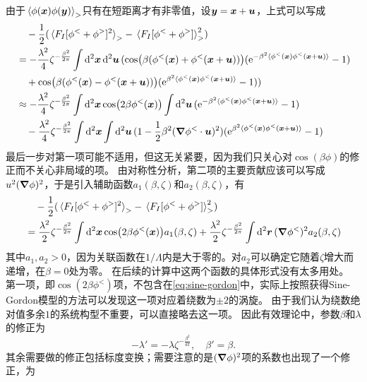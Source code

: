 \documentclass[hyperref, UTF8, a4paper]{ctexart}
\newcommand*{\ee}{\mathrm{e}}
\begin{document}
由于$\expval*{\phi(\vb*{x}) \phi(\vb*{y})}_>$只有在短距离才有非零值，设$\vb*{y} = \vb*{x} + \vb*{u}$，上式可以写成
\[
    \begin{aligned}
        &\quad - \frac{1}{2} (\expval*{F_I[\phi^<+\phi^>]^2}_> - \expval*{F_I[\phi^<+\phi^>]}_>^2) \\
        &= - \frac{\lambda^2}{4} \zeta^{- \frac{\beta^2}{2 \pi}} \int \dd[2]{\vb*{x}} \dd[2]{\vb*{u}} (\cos(\beta(\phi^<(\vb*{x}) + \phi^<(\vb*{x}+\vb*{u}))) (\ee^{- \beta^2 \expval*{\phi^<(\vb*{x}) \phi^<(\vb*{x}+\vb*{u})}} - 1) \\
        &\quad + \cos(\beta(\phi^<(\vb*{x}) - \phi^<(\vb*{x}+\vb*{u}))) (\ee^{ \beta^2 \expval*{\phi^<(\vb*{x}) \phi^<(\vb*{x}+\vb*{u})}} - 1)) \\
        &\approx - \frac{\lambda^2}{4} \zeta^{- \frac{\beta^2}{2 \pi}} \int \dd[2]{\vb*{x}} \cos(2 \beta \phi^<(\vb*{x})) \int \dd[2]{\vb*{u}} (\ee^{- \beta^2 \expval*{\phi^<(\vb*{x}) \phi^<(\vb*{x}+\vb*{u})}} - 1) \\
        &\quad - \frac{\lambda^2}{4} \zeta^{- \frac{\beta^2}{2 \pi}} \int \dd[2]{\vb*{x}} \int \dd[2]{\vb*{u}} (1 - \frac{1}{2} \beta^2 (\grad{\phi}^< \cdot \vb*{u})^2) (\ee^{\beta^2 \expval*{\phi^<(\vb*{x}) \phi^<(\vb*{x}+\vb*{u})}} - 1)
    \end{aligned}
\]
最后一步对第一项可能不适用，但这无关紧要，因为我们只关心对$\cos(\beta \phi)$的修正而不关心非局域的项。
由对称性分析，第二项的主要贡献应该可以写成$u^2 (\grad{\phi})^2$，于是引入辅助函数$a_1(\beta, \zeta)$和$a_2(\beta, \zeta)$，有
\[
    \begin{aligned}
        &\quad - \frac{1}{2} (\expval*{F_I[\phi^<+\phi^>]^2}_> - \expval*{F_I[\phi^<+\phi^>]}_>^2) \\
        &= \frac{\lambda^2}{2} \zeta^{- \frac{\beta^2}{2 \pi}} \int \dd[2]{\vb*{x}} \cos(2 \beta \phi^<(\vb*{x})) a_1(\beta, \zeta) + \frac{\lambda^2}{2} \zeta^{- \frac{\beta^2}{2 \pi}} \int \dd[2]{\vb*{r}} (\grad{\phi}^<)^2 a_2(\beta, \zeta)
    \end{aligned}
\]
其中$a_1, a_2>0$，因为关联函数在$1/\Lambda$内是大于零的。对$a_2$可以确定它随着$\zeta$增大而递增，在$\beta=0$处为零。
在后续的计算中这两个函数的具体形式没有太多用处。
第一项，即$\cos(2 \beta \phi^<)$项，不包含在\eqref{eq:sine-gordon}中，实际上按照获得Sine-Gordon模型的方法可以发现这一项对应着绕数为$\pm 2$的涡旋。
由于我们认为绕数绝对值多余$1$的系统构型不重要，可以直接略去这一项。
因此有效理论中，参数$\beta$和$\lambda$的修正为
\[
    - \lambda' = - \lambda \zeta^{- \frac{\beta^2}{4\pi}}, \quad \beta' = \beta.
\]
其余需要做的修正包括标度变换；需要注意的是$(\grad{\phi})^2$项的系数也出现了一个修正，为
\end{document}

